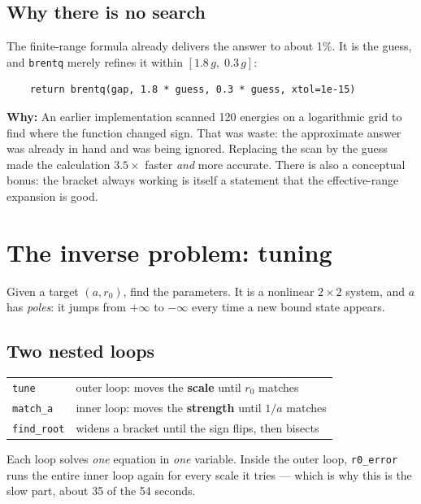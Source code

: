 \documentclass[11pt,a4paper]{article}
\newcommand{\why}[1]{\medskip\noindent\textbf{Why:} #1\medskip}
\begin{document}
\subsection*{Why there is no search}

The finite-range formula already delivers the answer to about 1\%. It is the
guess, and \texttt{brentq} merely refines it within $[1.8\,g,\;0.3\,g]$:

\begin{lstlisting}
    return brentq(gap, 1.8 * guess, 0.3 * guess, xtol=1e-15)
\end{lstlisting}

\why{An earlier implementation scanned 120 energies on a logarithmic grid to find
where the function changed sign. That was waste: the approximate answer was
already in hand and was being ignored. Replacing the scan by the guess made the
calculation $3.5\times$ faster \emph{and} more accurate. There is also a
conceptual bonus: the bracket always working is itself a statement that the
effective-range expansion is good.}

\section{The inverse problem: tuning}
\label{sec:tune}

Given a target $(a, r_0)$, find the parameters. It is a nonlinear $2\times2$
system, and $a$ has \emph{poles}: it jumps from $+\infty$ to $-\infty$ every
time a new bound state appears.

\subsection{Two nested loops}

\begin{center}
\begin{tabular}{ll}
\toprule
\texttt{tune} & outer loop: moves the \textbf{scale} until $r_0$ matches \\
\quad\texttt{match\_a} & inner loop: moves the \textbf{strength} until $1/a$ matches \\
\quad\quad\texttt{find\_root} & widens a bracket until the sign flips, then bisects \\
\bottomrule
\end{tabular}
\end{center}

Each loop solves \emph{one} equation in \emph{one} variable. Inside the outer
loop, \texttt{r0\_error} runs the entire inner loop again for every scale it
tries --- which is why this is the slow part, about 35 of the 54 seconds.
\end{document}
